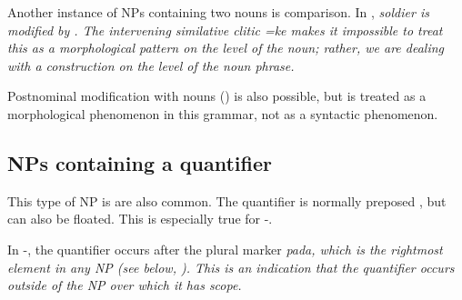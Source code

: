 Another instance of NPs containing two nouns is comparison. In , \em soldier \em is modified by . The intervening similative clitic \em =ke \em makes it impossible to treat this as a morphological pattern on the level of the noun; rather, we are dealing with a construction on the level of the noun phrase.



Postnominal modification with nouns  () is also possible, but is treated as a morphological phenomenon in this grammar, not as a syntactic phenomenon.
%
%




\subsection{NPs containing a quantifier}\label{sec:nppp:NPscontainingaquantifier}

This type of NP is are also common. The quantifier is normally preposed , but can also be floated. This is especially true for  -.


In -, the quantifier occurs after the plural marker \em pada\em, which is the rightmost element in any NP (see below, ). This is an indication that the quantifier occurs outside of the NP over which it has scope.


